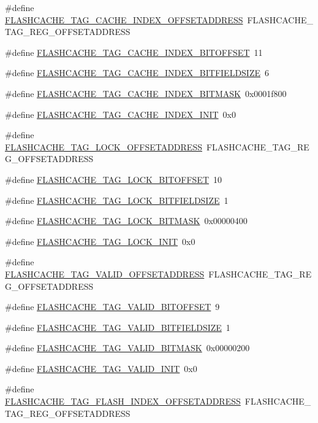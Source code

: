 \begin{DoxyCompactItemize}
\#define \hyperlink{a00550_accf6a86af96c276337e7b13678f41cbf}{FLASHCACHE\_\-TAG\_\-CACHE\_\-INDEX\_\-OFFSETADDRESS}~FLASHCACHE\_\-TAG\_\-REG\_\-OFFSETADDRESS
\item 
\#define \hyperlink{a00550_a06a06dc5e1344d980b33c855224cbf1c}{FLASHCACHE\_\-TAG\_\-CACHE\_\-INDEX\_\-BITOFFSET}~11
\item 
\#define \hyperlink{a00550_a47374c2793b3b40d6c844fb1bd4e7cd5}{FLASHCACHE\_\-TAG\_\-CACHE\_\-INDEX\_\-BITFIELDSIZE}~6
\item 
\#define \hyperlink{a00550_aad857b0345facedb022603ec18f29712}{FLASHCACHE\_\-TAG\_\-CACHE\_\-INDEX\_\-BITMASK}~0x0001f800
\item 
\#define \hyperlink{a00550_adbd53f01505fed3e9502b6bdaea3bfc1}{FLASHCACHE\_\-TAG\_\-CACHE\_\-INDEX\_\-INIT}~0x0
\item 
\#define \hyperlink{a00550_abfc1aaf4eb6e4d871131c60a7a8123d9}{FLASHCACHE\_\-TAG\_\-LOCK\_\-OFFSETADDRESS}~FLASHCACHE\_\-TAG\_\-REG\_\-OFFSETADDRESS
\item 
\#define \hyperlink{a00550_aa29ce89d0473f49ef7a4e738e2716d05}{FLASHCACHE\_\-TAG\_\-LOCK\_\-BITOFFSET}~10
\item 
\#define \hyperlink{a00550_aa55da415bceea81ab40d540e10145c81}{FLASHCACHE\_\-TAG\_\-LOCK\_\-BITFIELDSIZE}~1
\item 
\#define \hyperlink{a00550_a62a488b250fea84fd1811af77c98989c}{FLASHCACHE\_\-TAG\_\-LOCK\_\-BITMASK}~0x00000400
\item 
\#define \hyperlink{a00550_aa6bb9f54019c1dcf4c83897d7fc3b091}{FLASHCACHE\_\-TAG\_\-LOCK\_\-INIT}~0x0
\item 
\#define \hyperlink{a00550_a88581a06a74b96a3237a702ac6589937}{FLASHCACHE\_\-TAG\_\-VALID\_\-OFFSETADDRESS}~FLASHCACHE\_\-TAG\_\-REG\_\-OFFSETADDRESS
\item 
\#define \hyperlink{a00550_adc87910cda07c997c1382e36f7f8e3dd}{FLASHCACHE\_\-TAG\_\-VALID\_\-BITOFFSET}~9
\item 
\#define \hyperlink{a00550_ad0c358a0e1ea4a1da62ae4fb3ce5b3f2}{FLASHCACHE\_\-TAG\_\-VALID\_\-BITFIELDSIZE}~1
\item 
\#define \hyperlink{a00550_a3df401d3696ff3cc648cd622ea61dcbc}{FLASHCACHE\_\-TAG\_\-VALID\_\-BITMASK}~0x00000200
\item 
\#define \hyperlink{a00550_a1f950ebbc9a781eb958eff0033e90122}{FLASHCACHE\_\-TAG\_\-VALID\_\-INIT}~0x0
\item 
\#define \hyperlink{a00550_a6f59e0104425746e2c6c44268ce91948}{FLASHCACHE\_\-TAG\_\-FLASH\_\-INDEX\_\-OFFSETADDRESS}~FLASHCACHE\_\-TAG\_\-REG\_\-OFFSETADDRESS

\end{DoxyCompactItemize}
